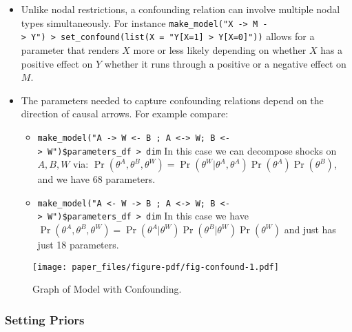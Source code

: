 \documentclass[
  11pt,
  article]{jss}
\providecommand{\tightlist}{%
  \setlength{\itemsep}{0pt}\setlength{\parskip}{0pt}}\usepackage{longtable,booktabs,array}
\begin{document}
\begin{itemize}
\tightlist
\item
  Unlike nodal restrictions, a confounding relation can involve multiple
  nodal types simultaneously. For instance
  \texttt{make\_model("X\ -\textgreater{}\ M\ -\textgreater{}\ Y")\ \textbar{}\textgreater{}\ set\_confound(list(X\ =\ "Y{[}X=1{]}\ \textgreater{}\ Y{[}X=0{]}"))}
  allows for a parameter that renders \(X\) more or less likely
  depending on whether \(X\) has a positive effect on \(Y\) whether it
  runs through a positive or a negative effect on \(M\).
\item
  The parameters needed to capture confounding relations depend on the
  direction of causal arrows. For example compare:

  \begin{itemize}
  \tightlist
  \item
    \texttt{make\_model("A\ -\textgreater{}\ W\ \textless{}-\ B\ ;\ A\ \textless{}-\textgreater{}\ W;\ B\ \textless{}-\textgreater{}\ W")\$parameters\_df\ \textbar{}\textgreater{}\ dim}
    In this case we can decompose shocks on \(A, B, W\) via:
    \(\Pr(\theta^A, \theta^B, \theta^W) = \Pr(\theta^W | \theta^A, \theta^A)\Pr(\theta^A)\Pr(\theta^B)\),
    and we have 68 parameters.
  \item
    \texttt{make\_model("A\ \textless{}-\ W\ -\textgreater{}\ B\ ;\ A\ \textless{}-\textgreater{}\ W;\ B\ \textless{}-\textgreater{}\ W")\$parameters\_df\ \textbar{}\textgreater{}\ dim}
    In this case we have
    \(\Pr(\theta^A, \theta^B, \theta^W) = \Pr(\theta^A | \theta^W)\Pr(\theta^B|\theta^W)\Pr(\theta^W)\)
    and just has just 18 parameters.
  \end{itemize}
\end{itemize}

\begin{figure}[t]

{\centering \texttt{[image: paper\_files/figure-pdf/fig-confound-1.pdf]}

}

\caption{\label{fig-confound}Graph of Model with Confounding.}

\end{figure}

\hypertarget{priors}{%
\subsubsection{Setting Priors}\label{priors}}
\end{document}
